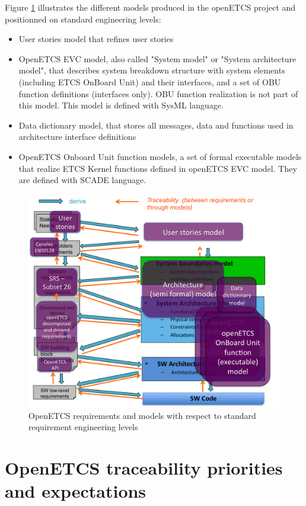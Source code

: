 \documentclass[11pt]{template/openetcs_report}
\begin{document}
Figure \ref{fig:openETCSRequirementsAndModels} illustrates the different models produced in the openETCS project and positionned on standard engineering levels:
\begin{itemize}
\item User stories model that refines user stories 
\item OpenETCS EVC model, also called "System model" or "System architecture model", that describes system breakdown structure with system elements (including ETCS OnBoard Unit) and their interfaces, and a set of OBU function definitions (interfaces only). OBU function realization is not part of this model. 
This model is defined with SysML language.
\item Data dictionary model, that stores all messages, data and functions used in architecture interface definitions
\item OpenETCS Onboard Unit function models, a set of formal executable models that realize ETCS Kernel functions defined in openETCS EVC model. They are defined with SCADE language.
\end{itemize}

 
\begin{figure}[htb]
\centering
\includegraphics[width=.9\linewidth]
{./images/openETCSRequirementsAndModels.png}
\caption{\label{fig:openETCSRequirementsAndModels}OpenETCS requirements and models with respect to standard requirement engineering levels}
\end{figure}

\chapter{OpenETCS traceability priorities and expectations}
\end{document}
